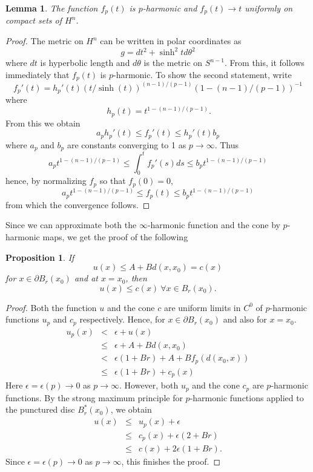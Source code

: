 \documentclass{ip-journal}
\newtheorem{lemma}[theorem]{Lemma}
\newtheorem{proposition}[theorem]{Proposition}
\theoremstyle{definition}
\numberwithin{equation}{section}
\begin{document}
\begin{lemma}The function $f_p(t)$ is $p$-harmonic and $f_p(t) \rightarrow t$  uniformly on compact sets of $H^n$.  
\end{lemma}
\begin{proof} The metric on $H^n$ can be written in polar coordinates as
\[
g=dt^2+\sinh^2 t d\theta^2
\]
where $dt$ is hyperbolic length and $d \theta$ is the metric on $S^{n-1}$. From this, it follows immediately that $f_p(t)$ is $p$-harmonic.
To show the second statement, write
\[
f_p'(t)=h_p'(t)(t/\sinh(t))^{(n-1)/(p-1)}\left (1-(n-1)/(p-1)\right )^{-1} 
\]
where 
\[
\ h_p(t)=t^{1-(n-1)/(p-1)}.
\]
From this we obtain
\[
a_p h_p'(t) \leq f_p'(t) \leq h_p'(t) b_p 
\]
where $a_p$ and $b_p$ are constants converging to 1 as $p \rightarrow \infty$. Thus
\[
a_p t^{1-(n-1)/(p-1)} \leq \int_0^t f_p'(s)ds \leq b_p t^{1-(n-1)/(p-1)} 
\]
hence, by normalizing $f_p$ so that $f_p(0)=0$,
\[
a_p t^{1-(n-1)/(p-1)} \leq  f_p(t) \leq b_p t^{1-(n-1)/(p-1)} 
\]
from which the convergence follows.
\end{proof}

Since we can approximate both the $\infty$-harmonic function and the cone by $p$-harmonic maps, we get the proof of the following 
\begin{proposition}\label{comocones1}  If
\[ 
u(x) \leq A + B d(x,x_0) = c(x)
\]
for $ x \in \partial B_r(x_0)$  and at $x = x_0$, then 
\[
u(x) \leq c(x) \ \forall x \in B_r(x_0).
\] 
\end{proposition}

\begin{proof}  Both the function $u$ and the cone $c $ are  uniform limits in $C^0$ of $p$-harmonic functions $u_p$ and $c_p$ respectively. Hence, for $x \in \partial B_r(x_0)$ and also for $x = x_0$. 
\begin{eqnarray*}
 u_p(x) &<& \epsilon + u(x) \\
 &\leq& \epsilon + A + B d(x,x_0)\\
 &<& \epsilon(1 + Br) + A + B f_p(d(x_0,x)) \\
 &\leq& \epsilon(1 + Br)  +c_p(x)
  \end{eqnarray*}
 Here $\epsilon = \epsilon(p) \rightarrow 0$ as $p \rightarrow \infty$. However, both $u_p$ and the cone $c_p$ are $p$-harmonic functions. By the strong maximum principle for $p$-harmonic functions applied to the punctured disc $B_r^*(x_0)$, we obtain
 \begin{eqnarray*}
u(x) &\leq &u_p(x) + \epsilon \\
&\leq & c_p(x) + \epsilon(2 + Br)\\
&\leq & c(x) + 2\epsilon(1 + Br).
  \end{eqnarray*}
Since $\epsilon = \epsilon(p)\rightarrow 0$ as $p \rightarrow \infty$, this finishes the proof. 
\end{proof}
\end{document}
